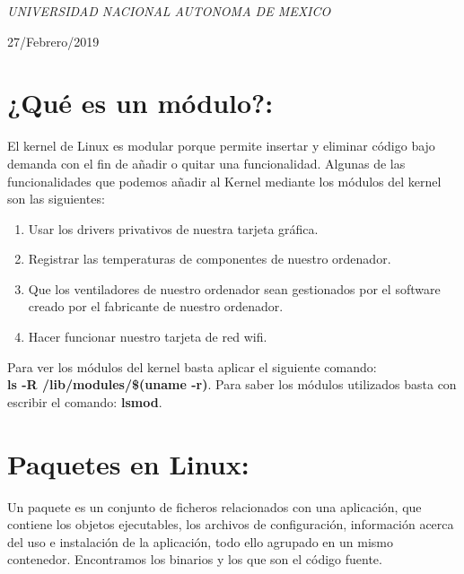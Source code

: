 \documentclass[a4paper, 11pt, oneside]{article}
\begin{document}
\begin{titlepage}
	\textit{UNIVERSIDAD NACIONAL AUTONOMA DE MEXICO} 
	
	\vfill
	
	
	
	
	\vspace{0.3\baselineskip} 
	
	27/Febrero/2019 
	
\end{titlepage}
\section*{¿Qué es un módulo?:}
El kernel de Linux es modular porque permite insertar y eliminar código bajo demanda con el fin de añadir o quitar una funcionalidad. Algunas de las funcionalidades que podemos añadir al Kernel mediante los módulos del kernel son las siguientes:

\begin{enumerate}
    \item Usar los drivers privativos de nuestra tarjeta gráfica.
    \item Registrar las temperaturas de componentes de nuestro ordenador.
    \item Que los ventiladores de nuestro ordenador sean gestionados por el software creado por el fabricante de nuestro ordenador.
    \item Hacer funcionar nuestro tarjeta de red wifi.
\end{enumerate}
Para ver los módulos del kernel basta aplicar el siguiente comando:\\
\textbf{ls -R /lib/modules/\$(uname -r)}.
Para saber los módulos utilizados basta con escribir el comando: \textbf{lsmod}.

\section*{Paquetes en Linux:}
Un paquete es un conjunto de ficheros relacionados con una aplicación, que contiene los objetos ejecutables, los archivos de configuración, información acerca del uso e instalación de la aplicación, todo ello agrupado en un mismo contenedor.  Encontramos los binarios y los que son el código fuente.
\end{document}
